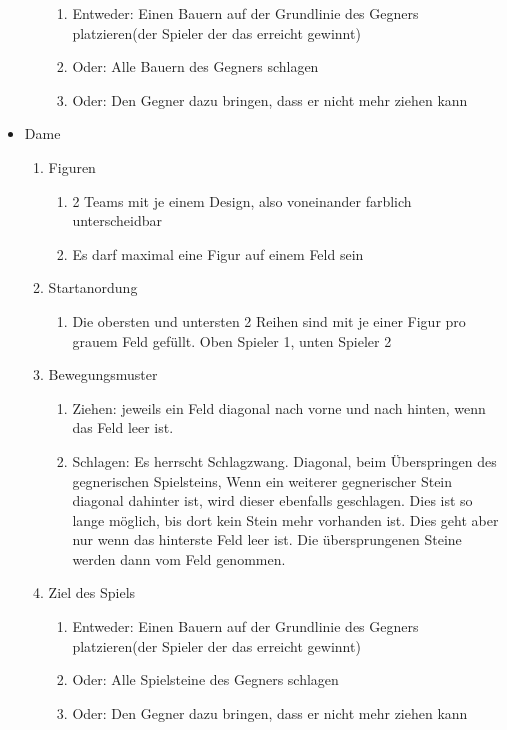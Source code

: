 \documentclass[14pt]{scrartcl}
\begin{document}
\begin{itemize}
\begin{enumerate}
\begin{enumerate}
            \item Entweder: Einen Bauern auf der Grundlinie des Gegners platzieren(der Spieler der das
            erreicht gewinnt)
            \item Oder: Alle Bauern des Gegners schlagen
            \item Oder: Den Gegner dazu bringen, dass er nicht mehr ziehen kann
        \end{enumerate}
    \end{enumerate}
    \item Dame
    \begin{enumerate}
        \item {Figuren}
        \begin{enumerate}
        \item 2 Teams mit je einem Design, also voneinander farblich unterscheidbar
        \item  Es darf maximal eine Figur auf einem Feld sein
        \end{enumerate}
        \item Startanordung
        \begin{enumerate}
            \item Die obersten und untersten 2 Reihen sind mit je einer Figur pro grauem Feld 
            gefüllt. Oben Spieler 1, unten Spieler 2        
        \end{enumerate}
        \item  Bewegungsmuster
        \begin{enumerate}
            \item Ziehen: jeweils ein Feld diagonal nach vorne und nach hinten, wenn das Feld 
            leer ist.
            \item Schlagen:  Es herrscht Schlagzwang.\newline
            Diagonal, beim Überspringen des gegnerischen Spielsteins,
           Wenn ein weiterer gegnerischer Stein diagonal dahinter ist, wird 
           dieser ebenfalls geschlagen. Dies ist so lange möglich, bis dort kein Stein mehr vorhanden ist. Dies geht aber nur wenn das hinterste Feld leer ist. Die 
           übersprungenen Steine werden dann vom Feld genommen.
        \end{enumerate}
        \item  Ziel des Spiels
        \begin{enumerate}
            \item Entweder: Einen Bauern auf der Grundlinie des Gegners platzieren(der Spieler der das
            erreicht gewinnt)
            \item Oder: Alle Spielsteine des Gegners schlagen
            \item Oder: Den Gegner dazu bringen, dass er nicht mehr ziehen kann
        \end{enumerate}
    \end{enumerate}
\end{itemize}
    
\end{document}
